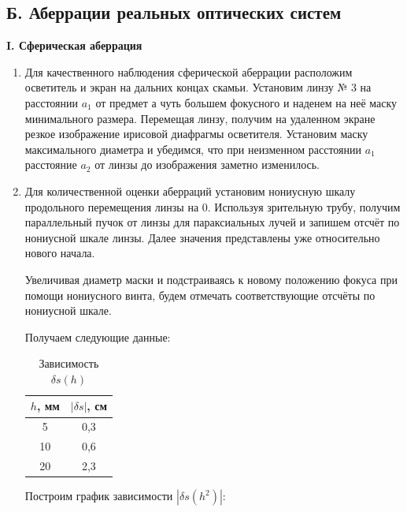 \documentclass[a4paper,12pt]{article} %
\begin{document}
	\subsection*{Б. Аберрации реальных оптических систем}
	
	\begin{center}
		\textbf{I. Сферическая аберрация}
	\end{center}

	\begin{enumerate}
		\item Для качественного наблюдения сферической аберрации расположим осветитель и экран на дальних концах скамьи. Установим линзу № 3 на расстоянии $a_1$ от предмет а чуть большем фокусного и наденем на неё маску минимального размера. Перемещая линзу, получим на удаленном экране резкое изображение ирисовой диафрагмы осветителя. Установим маску максимального диаметра и убедимся, что при неизменном расстоянии $a_1$ расстояние $a_2$ от линзы до изображения заметно изменилось.
		
		\item Для количественной оценки аберраций установим нониусную шкалу продольного перемещения линзы на 0. Используя зрительную трубу, получим параллельный пучок от линзы для параксиальных лучей и запишем отсчёт по нониусной шкале линзы. Далее значения представлены уже относительно нового начала. 
		
		Увеличивая диаметр маски и подстраиваясь к новому положению фокуса при помощи нониусного винта, будем отмечать соответствующие отсчёты по нониусной шкале.
		
		Получаем следующие данные:
		
		\begin{table}[h!]
			\centering
			\begin{tabular}{|c|c|}
				\hline
				$h$, мм & $|\delta s|$, см \\ \hline
				5       & 0,3            \\ \hline
				10      & 0,6            \\ \hline
				20      & 2,3            \\ \hline
			\end{tabular}
		\caption{Зависимость $\delta s(h)$}
		\end{table}
	
		Построим график зависимости $|\delta s(h^2)|$:
		\newpage
		

\end{enumerate}
\end{document}

